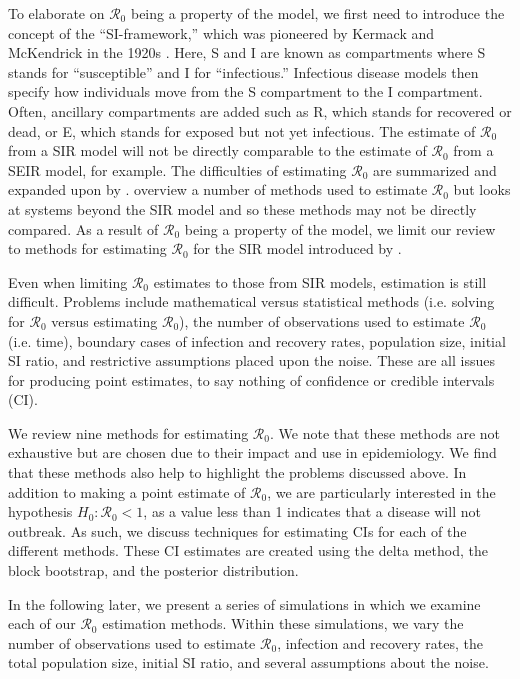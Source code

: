 \documentclass[12pt]{article}
\newcommand{\wxxsir}{nine } %
\newcommand{\rr}{\ensuremath{\mathcal{R}_0}}
\begin{document}
To elaborate on $\rr$ being a property of the model, we first need to introduce the concept of the ``SI-framework,'' which was pioneered by Kermack and McKendrick in the 1920s \citep{getz2006}.   Here, S and I are known as compartments where S stands for ``susceptible'' and I for ``infectious.'' Infectious disease models then specify how individuals move from the S compartment to the I compartment.  Often, ancillary compartments are added such as R, which stands for recovered or dead, or E, which stands for exposed but not yet infectious.  The estimate of $\rr$ from a SIR model will not be directly comparable to the estimate of $\rr$ from a SEIR model, for example.  The difficulties of estimating $\rr$ are summarized and expanded upon by \cite{li2011}.  \cite{driessche2017} overview a number of methods used to estimate $\rr$ but looks at systems beyond the SIR model and so these methods may not be directly compared.   As a result of $\rr$ being a property of the model, we limit our review to methods for estimating $\rr$ for the SIR model introduced by \cite{Kermack700}.

Even when limiting $\rr$ estimates to those from SIR models, estimation is still difficult.  Problems include mathematical versus statistical methods (i.e. solving for $\rr$ versus estimating $\rr$), the number of observations used to estimate $\rr$ (i.e. time), boundary cases of infection and recovery rates, population size, initial SI ratio, and restrictive assumptions placed upon the noise.  These are all issues for producing point estimates, to say nothing of confidence or credible intervals (CI).

We review \wxxsir methods for estimating $\rr$.  We note that these methods are not exhaustive but are chosen due to their impact and use in epidemiology.  We find that these methods also help to highlight the problems discussed above.  In addition to making a point estimate of $\rr$, we are particularly interested in the hypothesis  $H_0: \rr < 1$, as a value less than 1 indicates that a disease will not outbreak.  As such, we discuss techniques for estimating CIs for each of the different methods.  These CI estimates are created using the delta method, the block bootstrap, and the posterior distribution.

In the following later, we present a series of simulations in which we examine each of our $\rr$ estimation methods.  Within these simulations, we vary the number of observations used to estimate $\rr$, infection and recovery rates, the total population size, initial SI ratio, and several assumptions about the noise.
\end{document}
